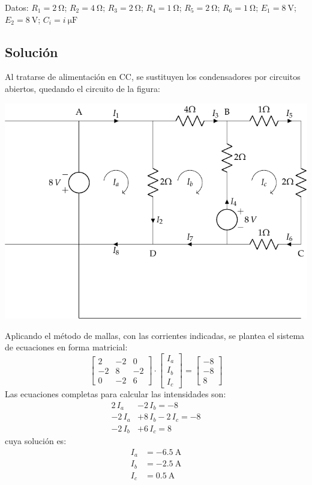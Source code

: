   Datos: $R_1 = \qty{2}{\ohm}$; $R_2 = \qty{4}{\ohm}$; $R_3 = \qty{2}{\ohm}$; $R_4 = \qty{1}{\ohm}$; $R_5 = \qty{2}{\ohm}$; $R_6 = \qty{1}{\ohm}$; $E_1 = \qty{8}{\volt}$; $E_2 = \qty{8}{\volt}$; $C_i = \qty[parse-numbers=false]{i}{\micro\farad}$

\subsection*{Solución}
Al tratarse de alimentación en CC, se sustituyen los condensadores por
circuitos abiertos, quedando el circuito de la figura:
\begin{center}
  \includegraphics{figuras/BT1_11_mod.pdf}
\end{center}

Aplicando el método de mallas, con las corrientes indicadas, se
plantea el sistema de ecuaciones en forma matricial:
\begin{equation*}
  \begin{bmatrix}
    2 & -2 & 0 \\
    -2 & 8 & -2 \\
    0 & -2 & 6
  \end{bmatrix} \cdot
  \begin{bmatrix}
    I_a\\
    I_b\\
    I_c
  \end{bmatrix} = %
  \begin{bmatrix}
    -8 \\
    -8\\
    8
  \end{bmatrix}
\end{equation*}
Las ecuaciones completas para calcular las intensidades son:
\begin{align*}
  2\,I_a&-2\,I_b = -8\\
  -2\,I_a&+8\,I_b-2\,I_c = -8\\
  -2\,I_b&+ 6\,I_c = 8
\end{align*}
cuya solución es:
\begin{align*}
  I_a&=\qty{-6.5}{\ampere}\\
  I_b&=\qty{-2.5}{\ampere}\\
  I_c&=\qty{0.5}{\ampere}\\
\end{align*}

